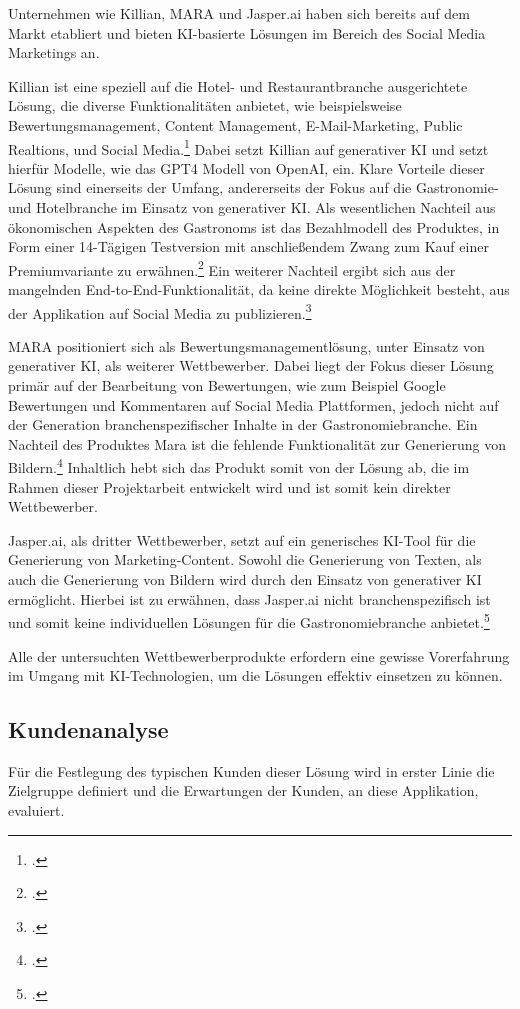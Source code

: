 Unternehmen wie Killian, MARA und Jasper.ai haben sich bereits auf dem Markt etabliert und bieten KI-basierte Lösungen im Bereich des Social Media Marketings an.

Killian ist eine speziell auf die Hotel- und Restaurantbranche ausgerichtete Lösung, die diverse Funktionalitäten anbietet, wie beispielsweise Bewertungsmanagement, Content Management, E-Mail-Marketing, Public Realtions, und Social Media.\footcite{kilian_ai_produkt}
Dabei setzt Killian auf generativer \ac{KI} und setzt hierfür Modelle, wie das GPT4 Modell von OpenAI, ein.
Klare Vorteile dieser Lösung sind einerseits der Umfang, andererseits der Fokus auf die Gastronomie- und Hotelbranche im Einsatz von generativer \ac{KI}.
Als wesentlichen Nachteil aus ökonomischen Aspekten des Gastronoms ist das Bezahlmodell des Produktes, in Form einer 14-Tägigen Testversion mit anschließendem Zwang zum Kauf einer Premiumvariante zu erwähnen.\footcite{kilian_ai_preise}
Ein weiterer Nachteil ergibt sich aus der mangelnden End-to-End-Funktionalität, da keine direkte Möglichkeit besteht, aus der Applikation auf Social Media zu publizieren.\footcite{kilian_ai_funktionen}

MARA positioniert sich als Bewertungsmanagementlösung, unter Einsatz von generativer \ac{KI}, als weiterer Wettbewerber.
Dabei liegt der Fokus dieser Lösung primär auf der Bearbeitung von Bewertungen, wie zum Beispiel Google Bewertungen und Kommentaren auf Social Media Plattformen, jedoch nicht auf der Generation branchenspezifischer Inhalte in der Gastronomiebranche.
Ein Nachteil des Produktes Mara ist die fehlende Funktionalität zur Generierung von Bildern.\footcite{mara_solutions_features}
Inhaltlich hebt sich das Produkt somit von der Lösung ab, die im Rahmen dieser Projektarbeit entwickelt wird und ist somit kein direkter Wettbewerber.

Jasper.ai, als dritter Wettbewerber, setzt auf ein generisches KI-Tool für die Generierung von Marketing-Content.
Sowohl die Generierung von Texten, als auch die Generierung von Bildern wird durch den Einsatz von generativer \ac{KI} ermöglicht.
Hierbei ist zu erwähnen, dass Jasper.ai nicht branchenspezifisch ist und somit keine individuellen Lösungen für die Gastronomiebranche anbietet.\footcite{jasper_ai_product_marketers}

Alle der untersuchten Wettbewerberprodukte erfordern eine gewisse Vorerfahrung im Umgang mit KI-Technologien, um die Lösungen effektiv einsetzen zu können.

\subsection{Kundenanalyse}
Für die Festlegung des typischen Kunden dieser Lösung wird in erster Linie die Zielgruppe definiert und die Erwartungen der Kunden, an diese Applikation, evaluiert.

